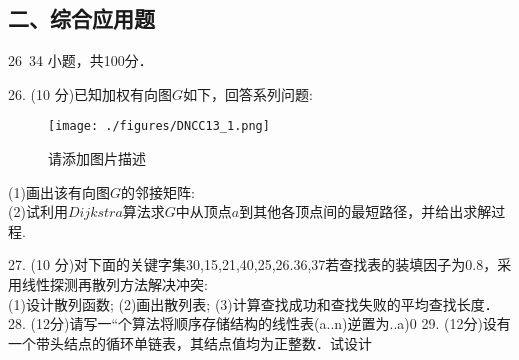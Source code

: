 \subsection{二、综合应用题}
26~34 小题，共100分．

26. (10 分)已知加权有向图$G$如下，回答系列问题: \\
\begin{figure}[ht]
\centering
\texttt{[image: ./figures/DNCC13\_1.png]}
\caption{请添加图片描述} \label{DNCC13_fig1}
\end{figure}
(1)画出该有向图$G$的邻接矩阵: \\
(2)试利用$Dijkstra$算法求$G$中从顶点$a$到其他各顶点间的最短路径，并给出求解过程.

27. (10 分)对下面的关键字集{30,15,21,40,25,26.36,37}若查找表的装填因子为$0.8$，采用线性探测再散列方法解决冲突: \\
(1)设计散列函数;
(2)画出散列表;
(3)计算查找成功和查找失败的平均查找长度．
28. (12分)请写一“个算法将顺序存储结构的线性表(a..n)逆置为..a)0
29. (12分)设有一个带头结点的循环单链表，其结点值均为正整数．试设计
